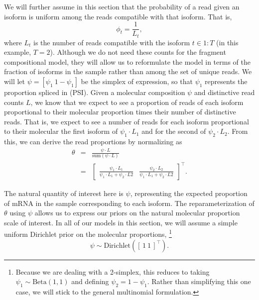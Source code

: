 \documentclass[11pt]{report}
\newcommand{\rngto}[1]{1{:}#1}
\newcommand{\rdistro}[2]{\textrm{#1}\!\left( #2 \right)}
\begin{document}
We will further assume in this section that the probability of a read
given an isoform is uniform among the reads compatible with that
isoform.  That is,
\[
  \phi_t = \frac{1}{L_t},
\]
where $L_t$ is the number of reads compatible with the isoform
$t \in \rngto{T}$ (in this example, $T = 2$).  Although we do not need
these counts for the fragment compositional model, they will allow us
to reformulate the model in terms of the fraction of isoforms in the
sample rather than among the set of unique reads.  We will let
$\psi = [\psi_1 \ 1 - \psi_1]$ be the simplex of expression, so that
$\psi_1$ represents the proportion spliced in (PSI).  Given a
molecular composition $\psi$ and distinctive read counts $L$, we know
that we expect to see a proportion of reads of each isoform
proportional to their molecular proportion times their number of
distinctive reads. That is, we expect to see a number of reads
for each isoform proportional to their molecular the first isoform of 
$\psi_1 \cdot L_1$ and for the second of $\psi_2 \cdot L_2$.  From
this, we can derive the read proportions by normalizing as
\begin{eqnarray*}
\theta
& = & \frac{\displaystyle \psi \cdot L}
{\displaystyle \textrm{sum}(\psi \cdot L)}
  \\[6pt]
  & = & 
      \begin{bmatrix}
        \frac{\displaystyle \psi_1 \cdot L_1}
             {\displaystyle \psi_1 \cdot L_1 + \psi_2 \cdot L2}
        &
        \frac{\displaystyle \psi_2 \cdot L_2}
             {\displaystyle \psi_1 \cdot L_1 + \psi_2 \cdot L2}
\end{bmatrix}^{\top}.
\end{eqnarray*}

The natural quantity of interest here is $\psi$, representing the
expected proportion of mRNA in the sample corresponding to each
isoform.  The reparameterization of $\theta$ using $\psi$ allows us to
express our priors on the natural molecular proportion scale of
interest.  In all of our models in this section, we will assume a
simple uniform Dirichlet prior on the molecular proportions,%
%
\footnote{Because we are dealing with a 2-simplex, this reduces to
  taking $\psi_1 \sim \textrm{Beta}(1, 1)$ and defining
  $\psi_2 = 1 - \psi_1$.  Rather than simplifying this one case,
  we will stick to the general multinomial formulation.}
%
\[
  \psi
  \sim
  \rdistro{Dirichlet}{[\, 1 \ 1 \,]^{\top}}.
\]
\end{document}

